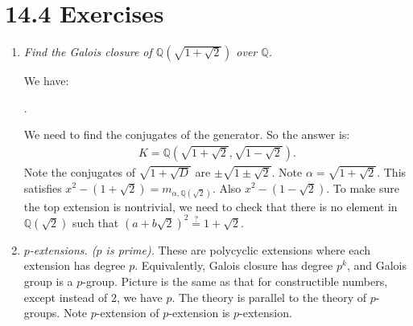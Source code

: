 \documentclass[9pt,reqno,twoside]{amsbook}
\theoremstyle{plain}
\numberwithin{section}{chapter}
\numberwithin{equation}{chapter}
\theoremstyle{definition}
\theoremstyle{remark}
\theoremstyle{plain}
\newcommand{\Q}{\mathbb{Q}}
\newcommand{\bee}{\begin{equation}\begin{aligned}}
\newcommand{\eee}{\end{aligned}\end{equation}}
\newcommand{\counter}{\setcounter}
\newcommand{\qwe}{\sqrt}
\begin{document}
  
  
  
  
  
  
  
  
  
  \section*{14.4 Exercises}
  
\begin{enumerate}[label=\arabic*.]
\item \textit{Find the Galois closure of $\Q(\qwe{1 + \qwe{2}})$ over $\Q$. }

We have:
\begin{center}
.
\end{center}
We need to find the conjugates of the generator. So the answer is:
\bee 
K = \Q(\qwe{1 + \qwe{2}},\qwe{1 - \qwe{2}}).
\eee
Note the conjugates of $\qwe{1 + \qwe{D}}$ are $\pm\qwe{1 \pm \qwe{2}}$. Note $\alpha = \qwe{1 + \qwe{2}}$. This satisfies $x^2 - (1 + \qwe{2}) = m_{\alpha,\Q(\qwe{2})}$. Also $x^2 - (1 - \qwe{2})$. To make sure the top extension is nontrivial, we need to check that there is no element in $\Q(\qwe{2})$ such that $(a + b\qwe{2})^2 \overset{?}{=} 1 + \qwe{2}$. 
\counter{enumi}{4}
\item \textit{$p$-extensions. ($p$ is prime). }
These are polycyclic extensions where each extension has degree $p$. Equivalently, Galois closure has degree $p^k$, and Galois group is a $p$-group. Picture is the same as that for constructible numbers, except instead of 2, we have $p$. The theory is parallel to the theory of $p$-groups. Note $p$-extension of $p$-extension is $p$-extension. 

\end{enumerate}
  
  
  
  
  
  
  
  
  
  
  
  
  
  
  
  
  
  
  
\end{document}

